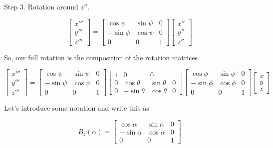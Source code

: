 Step 3.  Rotation around $z''$.

\begin{equation}\label{eqn:classicalMechanicsEulerAngles:n}
\begin{bmatrix}
x''' \\
y''' \\
z'''
\end{bmatrix}
=
\begin{bmatrix}
\cos\psi & \sin\psi & 0 \\
-\sin\psi & \cos\psi & 0 \\
0 & 0 & 1
\end{bmatrix}
\begin{bmatrix}
x'' \\
y'' \\
z''
\end{bmatrix}
\end{equation}

So, our full rotation is the composition of the rotation matrices

\begin{equation}\label{eqn:classicalMechanicsEulerAngles:n}
\begin{bmatrix}
x''' \\
y''' \\
z'''
\end{bmatrix}
=
\begin{bmatrix}
\cos\psi & \sin\psi & 0 \\
-\sin\psi & \cos\psi & 0 \\
0 & 0 & 1
\end{bmatrix}
\begin{bmatrix}
1 & 0 & 0 \\
0 & \cos\theta & \sin\theta & 0 \\
0 & -\sin\theta & \cos\theta & 0 
\end{bmatrix}
\begin{bmatrix}
\cos\phi & \sin\phi & 0 \\
-\sin\phi & \cos\phi & 0 \\
0 & 0 & 1
\end{bmatrix}
\begin{bmatrix}
x \\
y \\
z
\end{bmatrix}
\end{equation}

Let's introduce some notation and write this as

\begin{equation}\label{eqn:classicalMechanicsEulerAngles:n}
B_z(\alpha)
=
\begin{bmatrix}
\cos\alpha & \sin\alpha & 0 \\
-\sin\alpha & \cos\alpha & 0 \\
0 & 0 & 1
\end{bmatrix}
\end{equation}

